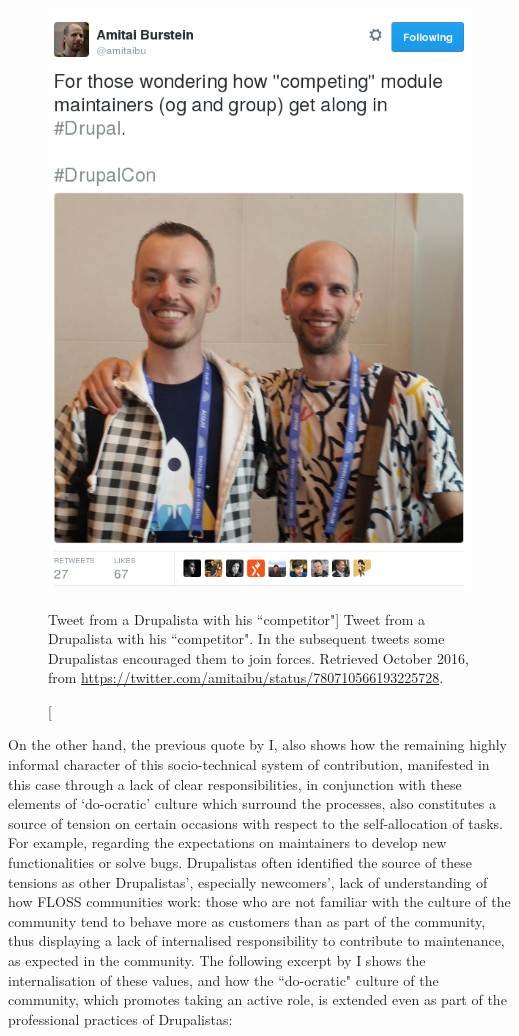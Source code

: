 \begin{figure}[H]
   \centering
    \includegraphics[scale=0.4]{img/online/coopetition.png}
    \caption[Tweet from a Drupalista with his ``competitor"]%
    {Tweet from a Drupalista with his ``competitor". In the subsequent tweets some Drupalistas encouraged them to join forces. Retrieved  October 2016, from \url{https://twitter.com/amitaibu/status/780710566193225728}.}
    \label{compiting}
\end{figure}

On the other hand, the previous quote by I, also shows how the remaining highly informal character of this socio-technical system of contribution, manifested in this case through a lack of clear responsibilities, in conjunction with these elements of `do-ocratic' culture which surround the processes, also constitutes a source of tension on certain occasions with respect to the self-allocation of tasks. For example, regarding the expectations on maintainers to develop new functionalities or solve bugs. Drupalistas often identified the source of these tensions as other Drupalistas', especially newcomers', lack of understanding of how FLOSS communities work: those who are not familiar with the culture of the community tend to behave more as customers than as part of the community, thus displaying a lack of internalised responsibility to contribute to maintenance, as expected in the community. The following excerpt by I shows the internalisation of these values, and how the ``do-ocratic" culture of the community, which promotes taking an active role, is extended even as part of the professional practices of Drupalistas:

